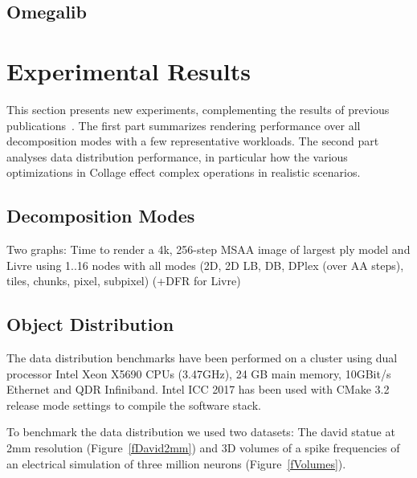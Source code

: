 \documentclass[10pt,journal,compsoc]{IEEEtran}
\newcommand{\fig}[1]{Figure~\ref{#1}}
\begin{document}
\subsection{Omegalib}

\section{Experimental Results}\label{sec:results}

This section presents new experiments, complementing the results of previous
publications~\cite{EP:07, EMP:09, MEP:10, EEP:11, EBAHMP:12, HBBES:13, deflect,
  SPEP:16}. The first part summarizes rendering performance over all
decomposition modes with a few representative workloads. The second part
analyses data distribution performance, in particular how the various
optimizations in Collage effect complex operations in realistic scenarios.

\subsection{Decomposition Modes}

Two graphs: Time to render a 4k, 256-step MSAA image of largest ply model and
Livre using 1..16 nodes with all modes (2D, 2D LB, DB, DPlex (over AA steps),
tiles, chunks, pixel, subpixel) (+DFR for Livre)

\subsection{Object Distribution}

The data distribution benchmarks have been performed on a cluster using
dual processor Intel Xeon X5690 CPUs (3.47GHz), 24 GB main memory, 10GBit/s
Ethernet and QDR Infiniband. Intel ICC 2017 has been used with CMake 3.2 release
mode settings to compile the software stack.

To benchmark the data distribution we used two datasets: The david statue at 2mm
resolution (\fig{fDavid2mm}) and 3D volumes of a spike frequencies of an
electrical simulation of three million neurons (\fig{fVolumes}).
\end{document}
